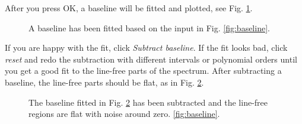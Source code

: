 \documentclass[11pt,a4paper]{article}
\begin{document}
After you press OK, a baseline will be fitted and plotted, see Fig. 
\ref{fig:baselinefit}.
\begin{figure}[h!]
  \centering
  \caption{A baseline has been fitted based on the input in Fig. 
  \ref{fig:baseline}.}
  \label{fig:baselinefit}
\end{figure}
If you are happy with the fit, click \emph{Subtract baseline}. If the fit looks
bad, click \emph{reset} and redo the subtraction with different intervals or
polynomial orders until you get a good fit to the line-free parts of the spectrum.
After subtracting a baseline, the line-free parts should be flat, as in 
Fig. \ref{fig:baselinesubtracted}.
\begin{figure}[h!]
  \centering
  \caption{The baseline fitted in Fig. \ref{fig:baselinesubtracted} has been
	  subtracted and the line-free regions are flat with noise around zero.
  \ref{fig:baseline}.}
  \label{fig:baselinesubtracted}
\end{figure}
\end{document}
